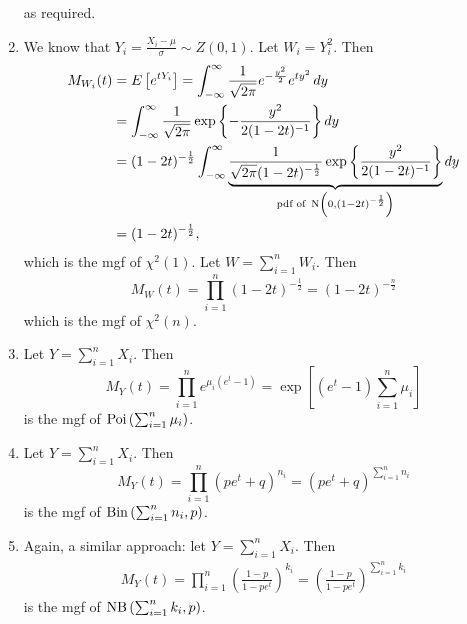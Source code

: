 \documentclass[notoc,notitlepage]{tufte-book}
\begin{document}
\begin{solution}
\begin{enumerate}
      as required.
    \item We know that $Y_i = \frac{X_i - \mu}{\sigma} \sim Z(0, 1)$. Let $W_i = Y_i^2$. Then
      \begin{align*}
        M_{W_i}(t) &= E\left[ e^{tY_i} \right] = \int_{-\infty}^{\infty} \frac{1}{\sqrt{2 \pi}} e^{-\frac{y^2}{2}} e^{ty^2} \mathop{}\!d{y} \\
                   &= \int_{-\infty}^{\infty} \frac{1}{\sqrt{2 \pi}} \exp\left\{-\frac{y^2}{2 ( 1 - 2t )^{-1}} \right\} \mathop{}\!d{y} \\
                   &= (1 - 2t)^{-\frac{1}{2}} \int_{-\infty}^{\infty} \underbrace{ \frac{1}{\sqrt{2 \pi} (1 - 2t)^{-\frac{1}{2}}} \exp \left\{ \frac{y^2}{2 ( 1 - 2t )^{-1}} \right\} }_{\text{pdf of } \operatorname{N}\left(0, (1 - 2t)^{-\frac{1}{2}}\right)} \mathop{}\!d{y} \\
                   &= (1 - 2t)^{-\frac{1}{2}},
      \end{align*}
      which is the mgf of $\chi^2 (1)$. Let $W = \sum_{i=1}^{n} W_i$. Then
      \begin{equation*}
        M_W(t) = \prod_{i=1}^{n} (1 - 2t)^{-\frac{1}{2}} = (1 - 2t)^{-\frac{n}{2}}
      \end{equation*}
      which is the mgf of $\chi^2 ( n )$.
    \item Let $Y = \sum_{i=1}^{n} X_i$. Then
      \begin{equation*}
        M_Y(t) = \prod_{i=1}^{n} e^{\mu_i (e^t - 1)} = \exp\left[ (e^t - 1) \sum_{i=1}^{n} \mu_i \right]
      \end{equation*}
      is the mgf of $\operatorname{Poi}\left( \sum_{i=1}^{n} \mu_i \right)$.
    \item Let $Y = \sum_{i=1}^{n} X_i$. Then
      \begin{equation*}
        M_Y(t) = \prod_{i=1}^{n} ( pe^t + q )^{n_i} = ( p e^t + q )^{\sum_{i=1}^{n} n_i}
      \end{equation*}
      is the mgf of $\operatorname{Bin}\left( \sum_{i=1}^{n} n_i, p \right)$.
    \item Again, a similar approach: let $Y = \sum_{i=1}^{n} X_i$. Then
      \begin{align*}
        M_Y(t) = \prod_{i=1}^{n} \left( \frac{1 - p}{1 - pe^t} \right)^{k_i} = \left( \frac{1 - p}{1 - pe^t} \right)^{\sum_{i=1}^{n} k_i}
      \end{align*}
      is the mgf of $\operatorname{NB}\left(\sum_{i=1}^{n} k_i, p\right)$.
  \end{enumerate}
\end{solution}
\end{document}
